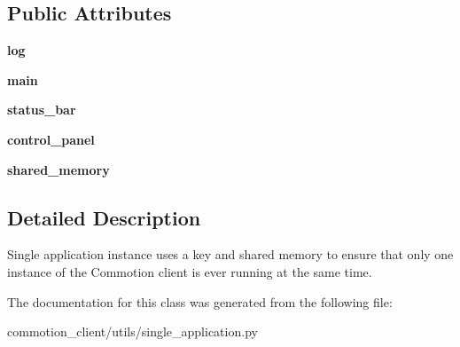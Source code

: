 \subsection*{Public Attributes}
\begin{DoxyCompactItemize}
\item 
\hypertarget{classcommotion__client_1_1utils_1_1single__application_1_1SingleApplication_a0d42a4c04a6fc8df6522699695110c2b}{{\bfseries log}}\label{classcommotion__client_1_1utils_1_1single__application_1_1SingleApplication_a0d42a4c04a6fc8df6522699695110c2b}

\item 
\hypertarget{classcommotion__client_1_1utils_1_1single__application_1_1SingleApplication_a1aceece78c1e408d8d94ed8764f246a4}{{\bfseries main}}\label{classcommotion__client_1_1utils_1_1single__application_1_1SingleApplication_a1aceece78c1e408d8d94ed8764f246a4}

\item 
\hypertarget{classcommotion__client_1_1utils_1_1single__application_1_1SingleApplication_ae4582c8bf029813714440ea61ef77b3d}{{\bfseries status\+\_\+bar}}\label{classcommotion__client_1_1utils_1_1single__application_1_1SingleApplication_ae4582c8bf029813714440ea61ef77b3d}

\item 
\hypertarget{classcommotion__client_1_1utils_1_1single__application_1_1SingleApplication_adbe8eec2bb7d760cb6f39fd03957f8f6}{{\bfseries control\+\_\+panel}}\label{classcommotion__client_1_1utils_1_1single__application_1_1SingleApplication_adbe8eec2bb7d760cb6f39fd03957f8f6}

\item 
\hypertarget{classcommotion__client_1_1utils_1_1single__application_1_1SingleApplication_ae2b4a1243e937e06fef4cf521cc5cca5}{{\bfseries shared\+\_\+memory}}\label{classcommotion__client_1_1utils_1_1single__application_1_1SingleApplication_ae2b4a1243e937e06fef4cf521cc5cca5}

\end{DoxyCompactItemize}


\subsection{Detailed Description}
\begin{DoxyVerb}Single application instance uses a key and shared memory to ensure that only one instance of the Commotion client is ever running at the same time.
\end{DoxyVerb}
 

The documentation for this class was generated from the following file\+:\begin{DoxyCompactItemize}
\item 
commotion\+\_\+client/utils/single\+\_\+application.\+py\end{DoxyCompactItemize}

